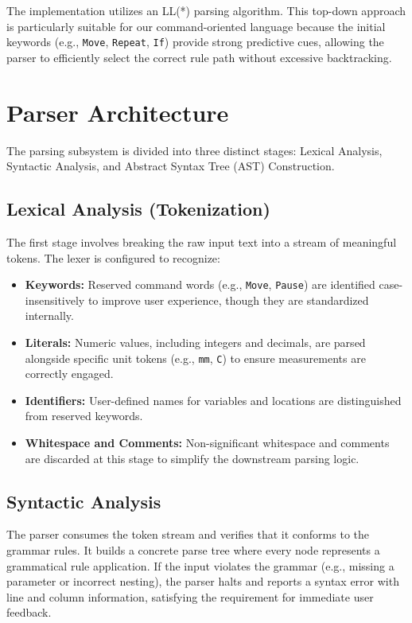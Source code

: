 The implementation utilizes an LL(*) parsing algorithm. This top-down approach is particularly suitable for our command-oriented language because the initial keywords (e.g., \texttt{Move}, \texttt{Repeat}, \texttt{If}) provide strong predictive cues, allowing the parser to efficiently select the correct rule path without excessive backtracking.

\section{Parser Architecture}

The parsing subsystem is divided into three distinct stages: Lexical Analysis, Syntactic Analysis, and Abstract Syntax Tree (AST) Construction.

\subsection{Lexical Analysis (Tokenization)}
The first stage involves breaking the raw input text into a stream of meaningful tokens. The lexer is configured to recognize:
\begin{itemize}
    \item \textbf{Keywords:} Reserved command words (e.g., \texttt{Move}, \texttt{Pause}) are identified case-insensitively to improve user experience, though they are standardized internally.
    \item \textbf{Literals:} Numeric values, including integers and decimals, are parsed alongside specific unit tokens (e.g., \texttt{mm}, \texttt{C}) to ensure measurements are correctly engaged.
    \item \textbf{Identifiers:} User-defined names for variables and locations are distinguished from reserved keywords.
    \item \textbf{Whitespace and Comments:} Non-significant whitespace and comments are discarded at this stage to simplify the downstream parsing logic.
\end{itemize}

\subsection{Syntactic Analysis}
The parser consumes the token stream and verifies that it conforms to the grammar rules. It builds a concrete parse tree where every node represents a grammatical rule application. If the input violates the grammar (e.g., missing a parameter or incorrect nesting), the parser halts and reports a syntax error with line and column information, satisfying the requirement for immediate user feedback.

